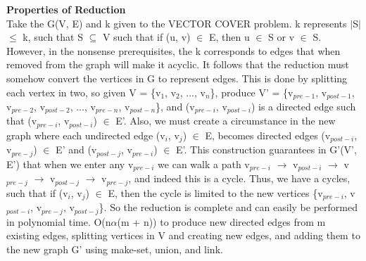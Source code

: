 \documentclass[10pt]{csc_assignment}
\begin{document}
\begin{description}
\textbf{Properties of Reduction}\\
Take the G(V, E) and k given to the VECTOR COVER problem. k represents $\mid$S$\mid$ $\leqslant$ k, such that S $\subseteq$ V such that if (u, v) $\in$ E, then u $\in$ S or v $\in$ S. However, in the nonsense prerequisites, the k corresponds to edges that when removed from the graph will make it acyclic. It follows that the reduction must somehow convert the vertices in G to represent edges. This is done by splitting each vertex in two, so given V = \{v$_{1}$, v$_{2}$, ..., v$_{n}$\}, produce V' = \{v$_{pre-1}$, v$_{post-1}$, v$_{pre-2}$, v$_{post-2}$, ..., v$_{pre-n}$, v$_{post-n}$\}, and (v$_{pre-i}$, v$_{post-i}$) is a directed edge such that (v$_{pre-i}$, v$_{post-i}$) $\in$  E'. Also, we must create a circumstance in the new graph where each undirected edge (v$_{i}$, v$_{j}$) $\in$ E, becomes directed edges (v$_{post-i}$, v$_{pre-j}$) $\in$ E' and (v$_{post-j}$, v$_{pre-i}$) $\in$ E'. This construction guarantees in G'(V', E') that when we enter any v$_{pre-i}$ we can walk a path v$_{pre-i}$ $\rightarrow$ v$_{post-i}$ $\rightarrow$ v$_{pre-j}$ $\rightarrow$ v$_{post-j}$ $\rightarrow$ v$_{pre-j}$, and indeed this is a cycle. Thus, we have a cycles, such that if (v$_{i}$, v$_{j}$) $\in$ E, then the cycle is limited to the new vertices \{v$_{pre-i}$, v$_{post-i}$, v$_{pre-j}$, v$_{post-j}$\}. So the reduction is complete and can easily be performed in polynomial time. O(n$\alpha$(m + n)) to produce new directed edges from m existing edges, splitting vertices in V and creating new edges, and adding them to the new graph G' using make-set, union, and link.\\


\end{description}
\end{document}
